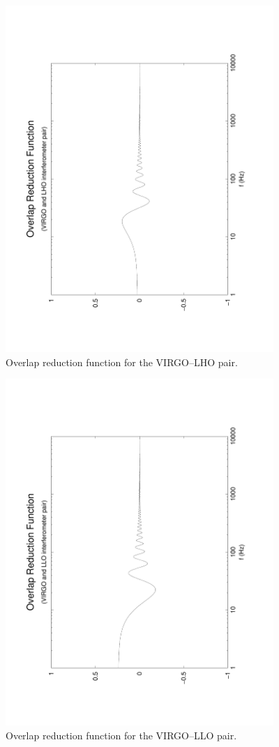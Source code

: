 \documentclass{article}
\begin{document}
\begin{figure}[htb!]
\begin{center}
\noindent\includegraphics[width=4in,angle=-90]{VIRGOLHO}
\caption{\label{f:VIRGOLHO}
Overlap reduction function for the VIRGO--LHO pair.}
\end{center}
\end{figure}
%
%
\begin{figure}[htb!]
\begin{center}
\noindent\includegraphics[width=4in,angle=-90]{VIRGOLLO}
\caption{\label{f:VIRGOLLO}
Overlap reduction function for the VIRGO--LLO pair.}
\end{center}
\end{figure}
\end{document}

